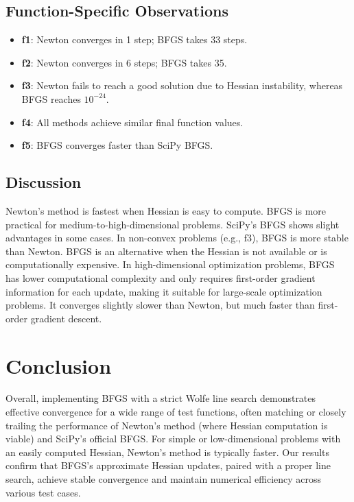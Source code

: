 \documentclass[a4paper,12pt]{article}
\begin{document}
\subsection{Function-Specific Observations}
\begin{itemize}
    \item \textbf{f1}: Newton converges in 1 step; BFGS takes 33 steps.
    \item \textbf{f2}: Newton converges in 6 steps; BFGS takes 35.
    \item \textbf{f3}: Newton fails to reach a good solution due to Hessian instability, whereas BFGS reaches $10^{-24}$.
    \item \textbf{f4}: All methods achieve similar final function values.
    \item \textbf{f5}: BFGS converges faster than SciPy BFGS.
\end{itemize}

\subsection{Discussion}
Newton's method is fastest when Hessian is easy to compute. BFGS is more practical for medium-to-high-dimensional problems. SciPy’s BFGS shows slight advantages in some cases. In non-convex problems (e.g., f3), BFGS is more stable than Newton. BFGS is an alternative when the Hessian is not available or is computationally expensive. In high-dimensional optimization problems, BFGS has lower computational complexity and only requires first-order gradient information for each update, making it suitable for large-scale optimization problems. It converges slightly slower than Newton, but much faster than first-order gradient descent.


\section{Conclusion}

Overall, implementing BFGS with a strict Wolfe line search demonstrates effective convergence for a wide range of test functions, often matching or closely trailing the performance of Newton’s method (where Hessian computation is viable) and SciPy’s official BFGS. For simple or low-dimensional problems with an easily computed Hessian, Newton’s method is typically faster. Our results confirm that BFGS’s approximate Hessian updates, paired with a proper line search, achieve stable convergence and maintain numerical efficiency across various test cases.
\end{document}
